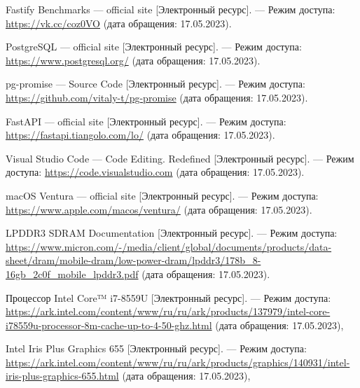 \begin{thebibliography}{}
	Fastify Benchmarks --- official site [Электронный ресурс]. --- Режим доступа: \url{https://vk.cc/coz0VO} (дата обращения: 17.05.2023).

	PostgreSQL --- official site [Электронный ресурс]. --- Режим доступа: \url{https://www.postgresql.org/} (дата обращения: 17.05.2023).
	
	pg-promise --- Source Code [Электронный ресурс]. --- Режим доступа: \url{https://github.com/vitaly-t/pg-promise} (дата обращения: 17.05.2023).

	FastAPI --- official site [Электронный ресурс]. --- Режим доступа: \url{https://fastapi.tiangolo.com/lo/} (дата обращения: 17.05.2023).

	Visual Studio Code --- Code Editing. Redefined [Электронный ресурс]. --- Режим доступа: \url{https://code.visualstudio.com} (дата обращения: 17.05.2023).
	
	macOS Ventura --- official site [Электронный
	ресурс]. --- Режим доступа: \url{https://www.apple.com/macos/ventura/} (дата обращения: 17.05.2023).

	LPDDR3 SDRAM Documentation [Электронный
	ресурс]. --- Режим доступа: \url{https://www.micron.com/-/media/client/global/documents/products/data-sheet/dram/mobile-dram/low-power-dram/lpddr3/178b_8-16gb_2c0f_mobile_lpddr3.pdf} (дата обращения: 17.05.2023).

	Процессор Intel Core™ i7-8559U [Электронный ресурс]. --- Режим доступа: \url{https://ark.intel.com/content/www/ru/ru/ark/products/137979/intel-core-i78559u-processor-8m-cache-up-to-4-50-ghz.html} (дата обращения: 17.05.2023),
	
	Intel Iris Plus Graphics 655 [Электронный ресурс]. --- Режим доступа: \url{https://ark.intel.com/content/www/ru/ru/ark/products/graphics/140931/intel-iris-plus-graphics-655.html} (дата обращения: 17.05.2023),

\end{thebibliography}
\endgroup

\pagebreak